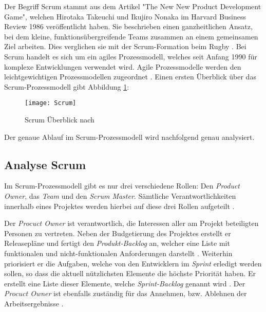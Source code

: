 Der Begriff Scrum stammt aus dem Artikel "The New New Product Development Game", welchen Hirotaka Takeuchi und Ikujiro Nonaka im Harvard Business Review 1986 veröffentlicht haben. Sie beschrieben einen ganzheitlichen Ansatz, bei dem kleine, funktionsübergreifende Teams zusammen an einem gemeinsamen Ziel arbeiten. Dies verglichen sie mit der Scrum-Formation beim Rugby \cite{Pham2012,Takeuchi1986}. \newline
Bei Scrum handelt es sich um ein agiles Prozessmodell, welches seit Anfang 1990 für komplexe Entwicklungen verwendet wird. Agile Prozessmodelle werden den leichtgewichtigen Prozessmodellen zugeordnet \cite{Hanser2010, Lacey2012}. Einen ersten Überblick über das Scrum-Prozessmodell gibt Abbildung \ref{fig:Scrum}:

\begin{figure}[htp]
\begin{center}
  \texttt{[image: Scrum]} %
  \caption{Scrum Überblick nach \cite{scrum2008}}
  \label{fig:Scrum}
\end{center}
\end{figure}

Der genaue Ablauf im Scrum-Prozessmodell wird nachfolgend genau analysiert.

\subsection{Analyse Scrum}


Im Scrum-Prozessmodell gibt es nur drei verschiedene Rollen: Den \textit{Product Owner}, das \textit{Team} und den \textit{Scrum Master}. Sämtliche Verantwortlichkeiten innerhalb eines Projektes werden hierbei auf diese drei Rollen aufgeteilt \cite{Schwaber2004}. \newline

Der \textit{Procuct Owner} ist verantwortlich, die Interessen aller am Projekt beteiligten Personen zu vertreten. Neben der Budgetierung des Projektes erstellt er  Releasepläne und fertigt den \textit{Produkt-Backlog} an, welcher eine Liste mit funktionalen und nicht-funktionalen Anforderungen darstellt \cite{Schwaber2004, Pichler2010,Schwaber2007}. Weiterhin priorisiert er die Aufgaben, welche von den Entwicklern im \textit{Sprint} erledigt werden sollen, so dass die aktuell nützlichsten Elemente die höchste Priorität haben. Er erstellt eine Liste dieser Elemente, welche \textit{Sprint-Backlog} genannt wird \cite{Henning2011, Schwaber2007,Pichler2010}. Der \textit{Procuct Owner} ist ebenfalls zuständig für das Annehmen, bzw. Ablehnen der Arbeitsergebnisse \cite{eclipseScrum}. \newline

